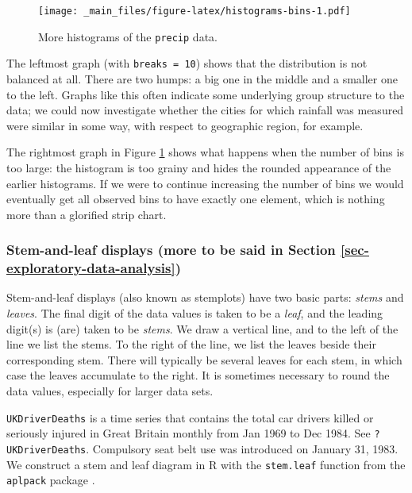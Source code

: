 \documentclass[]{book}
\numberwithin{equation}{chapter}
\numberwithin{figure}{chapter}
\theoremstyle{plain}
\theoremstyle{definition}
\theoremstyle{remark}
\theoremstyle{definition}
\theoremstyle{definition}
\theoremstyle{remark}
\let\BeginKnitrBlock\begin \let\EndKnitrBlock\end
\begin{document}
\begin{figure}[htbp]
\centering
\texttt{[image: \_main\_files/figure-latex/histograms-bins-1.pdf]}
\caption{\label{fig:histograms-bins}\small More histograms of the \texttt{precip}
data.}
\end{figure}




The leftmost graph (with \texttt{breaks\ =\ 10}) shows that the
distribution is not balanced at all. There are two humps: a big one in
the middle and a smaller one to the left. Graphs like this often
indicate some underlying group structure to the data; we could now
investigate whether the cities for which rainfall was measured were
similar in some way, with respect to geographic region, for example.

The rightmost graph in Figure \ref{fig:histograms-bins} shows what
happens when the number of bins is too large: the histogram is too
grainy and hides the rounded appearance of the earlier histograms. If we
were to continue increasing the number of bins we would eventually get
all observed bins to have exactly one element, which is nothing more
than a glorified strip chart.

\subsubsection{Stem-and-leaf displays (more to be said in Section
\ref{sec-exploratory-data-analysis})}\label{stem-and-leaf-displays-more-to-be-said-in-section-refsec-exploratory-data-analysis}

Stem-and-leaf displays (also known as stemplots) have two basic parts:
\emph{stems} and \emph{leaves}. The final digit of the data values is
taken to be a \emph{leaf}, and the leading digit(s) is (are) taken to be
\emph{stems}. We draw a vertical line, and to the left of the line we
list the stems. To the right of the line, we list the leaves beside
their corresponding stem. There will typically be several leaves for
each stem, in which case the leaves accumulate to the right. It is
sometimes necessary to round the data values, especially for larger data
sets.

\bigskip

\BeginKnitrBlock{example}[Driver Deaths in the United Kingdom]
\protect\hypertarget{ex:ukdriverdeaths-first}{}{\label{ex:ukdriverdeaths-first}
\iffalse (Driver Deaths in the United Kingdom)
\fi }\texttt{UKDriverDeaths}  is a time series that
contains the total car drivers killed or seriously injured in Great
Britain monthly from Jan 1969 to Dec 1984. See \texttt{?UKDriverDeaths}.
Compulsory seat belt use was introduced on January 31, 1983. We
construct a stem and leaf diagram in R with the \texttt{stem.leaf}
 function from the \texttt{aplpack}
 package \autocite{aplpack}.
\EndKnitrBlock{example}
\end{document}
